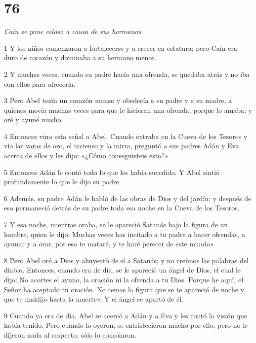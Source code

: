 \chapter{76}

\par \textit{Caín se pone celoso a causa de sus hermanas.}

\par 1 Y los niños comenzaron a fortalecerse y a crecer en estatura; pero Caín era duro de corazón y dominaba a su hermano menor.

\par 2 Y muchas veces, cuando su padre hacía una ofrenda, se quedaba atrás y no iba con ellos para ofrecerla.

\par 3 Pero Abel tenía un corazón manso y obedecía a su padre y a su madre, a quienes movía muchas veces para que le hicieran una ofrenda, porque lo amaba; y oré y ayuné mucho.

\par 4 Entonces vino esta señal a Abel. Cuando entraba en la Cueva de los Tesoros y vio las varas de oro, el incienso y la mirra, preguntó a sus padres Adán y Eva acerca de ellos y les dijo: «¿Cómo conseguisteis esto?»

\par 5 Entonces Adán le contó todo lo que les había sucedido. Y Abel sintió profundamente lo que le dijo su padre.

\par 6 Además, su padre Adán le habló de las obras de Dios y del jardín; y después de eso permaneció detrás de su padre toda esa noche en la Cueva de los Tesoros.

\par 7 Y esa noche, mientras oraba, se le apareció Satanás bajo la figura de un hombre, quien le dijo: Muchas veces has incitado a tu padre a hacer ofrendas, a ayunar y a orar, por eso te mataré, y te haré perecer de este mundo».

\par 8 Pero Abel oró a Dios y ahuyentó de sí a Satanás; y no creímos las palabras del diablo. Entonces, cuando era de día, se le apareció un ángel de Dios, el cual le dijo: No acortes el ayuno, la oración ni la ofrenda a tu Dios. Porque he aquí, el Señor ha aceptado tu oración. No temas la figura que se te apareció de noche y que te maldijo hasta la muerte». Y el ángel se apartó de él.

\par 9 Cuando ya era de día, Abel se acercó a Adán y a Eva y les contó la visión que había tenido. Pero cuando lo oyeron, se entristecieron mucho por ello, pero no le dijeron nada al respecto; sólo lo consolaron.

